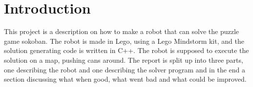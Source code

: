 \section{Introduction}

This project is a description on how to make a robot that can solve the puzzle game sokoban. 
The robot is made in Lego, using a Lego Mindstorm kit, and the solution generating code is written in C++. 
The robot is supposed to execute the solution on a map, pushing cans around. 
The report is split up into three parts, one describing the robot and one describing the solver program and in the end a section discussing what when good, what went bad and what could be improved.
